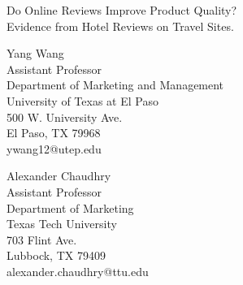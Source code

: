 
\begin{titlepage}

  \newcommand{\HRule}{\rule{\linewidth}{0.5mm}} %

  \center %





  \vspace{1.5 cm}
Do Online Reviews Improve Product Quality? \\
Evidence from Hotel Reviews on Travel Sites.
 \vspace{.5 cm}

  Yang Wang\\
  Assistant Professor\\
  Department of Marketing and Management\\
  University of Texas at El Paso\\
  500 W. University Ave.\\
  El Paso, TX 79968\\
  ywang12@utep.edu\\
  \vspace{.5 cm}

  Alexander Chaudhry\\
  Assistant Professor\\
  Department of Marketing\\
  Texas Tech University\\
  703 Flint Ave.\\
  Lubbock, TX 79409\\
  alexander.chaudhry@ttu.edu\\
  \vspace{.5 cm}
  

\end{titlepage}
